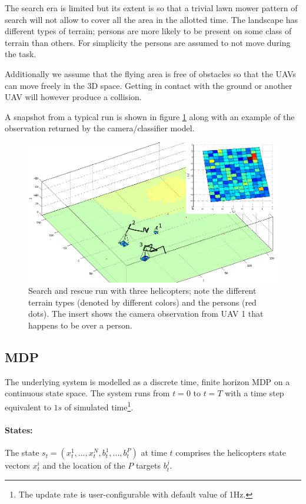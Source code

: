 \documentclass[a4paper,11pt]{report}
\begin{document}
The search era is limited but its extent is so that a trivial lawn mower pattern of search will not allow to cover all the area in the allotted time. The landscape has different types of terrain; persons are more likely to be present on some class of terrain than others. For simplicity the persons are assumed to not move during the task. 

Additionally we assume that the flying area is free of obstacles so that the UAVs can move freely in the 3D space. Getting in contact with the ground or another UAV will however produce a collision.

A snapshot from a typical run is shown in figure \ref{fig:searchrescue} along with an example of the observation returned by the camera/classifier model.
\begin{figure}[ht]
\centering
\includegraphics[width=15cm]{searchrescue.jpg}
\caption{Search and rescue run with three helicopters; note the different terrain types (denoted by different colors) and the persons (red dots). The insert shows the camera observation from UAV 1 that happens to be over a person. \label{fig:searchrescue}}
\end{figure}

\subsection{MDP}
The underlying system is modelled as a discrete time, finite horizon MDP on a continuous state space. The system runs from $t=0$ to $t=T$ with a time step equivalent to $1s$ of simulated time\footnote{The update rate is user-configurable with default value of 1Hz.}.

\paragraph{States:} The state $s_t=(x^1_t,...,x^{N}_t,b^1_t,...,b^P_t)$ at time $t$ comprises the helicopters state vectors $x^i_t$ and the location of the $P$ targets $b^j_t$.
\end{document}
